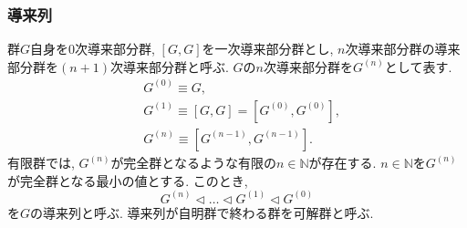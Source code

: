 \documentclass[11pt, a4paper]{jsarticle}
\begin{document}
\subsubsection{導来列}
群$G$自身を0次導来部分群, $[G,G]$を一次導来部分群とし, $n$次導来部分群の導来部分群を$(n+1)$次導来部分群と呼ぶ.
$G$の$n$次導来部分群を$G^{(n)}$として表す.
\begin{equation}
\begin{split}
&G^{(0)} \equiv G, \\
&G^{(1)} \equiv [G,G] = [G^{(0)},G^{(0)}], \\
&G^{(n)} \equiv [G^{(n-1)},G^{(n-1)}].
\end{split}
\end{equation}
有限群では, $G^{(n)}$が完全群となるような有限の$n\in\mathbb{N}$が存在する.
$n\in\mathbb{N}$を$G^{(n)}$が完全群となる最小の値とする.
このとき,
\begin{equation}
G^{(n)} \triangleleft \dots \triangleleft G^{(1)} \triangleleft G^{(0)}
\end{equation}
を$G$の導来列と呼ぶ.
導来列が自明群で終わる群を可解群と呼ぶ.










\end{document}
